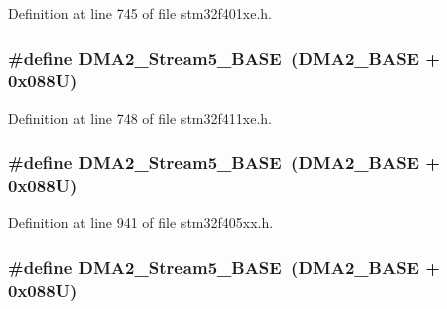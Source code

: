 Definition at line 745 of file stm32f401xe.\+h.

\subsubsection[{\texorpdfstring{D\+M\+A2\+\_\+\+Stream5\+\_\+\+B\+A\+SE}{DMA2_Stream5_BASE}}]{\setlength{\rightskip}{0pt plus 5cm}\#define D\+M\+A2\+\_\+\+Stream5\+\_\+\+B\+A\+SE~({\bf D\+M\+A2\+\_\+\+B\+A\+SE} + 0x088\+U)}\hypertarget{group___peripheral__registers__structures_gaed1460fdc407b6decfbffccb0260d0af}{}\label{group___peripheral__registers__structures_gaed1460fdc407b6decfbffccb0260d0af}


Definition at line 748 of file stm32f411xe.\+h.

\subsubsection[{\texorpdfstring{D\+M\+A2\+\_\+\+Stream5\+\_\+\+B\+A\+SE}{DMA2_Stream5_BASE}}]{\setlength{\rightskip}{0pt plus 5cm}\#define D\+M\+A2\+\_\+\+Stream5\+\_\+\+B\+A\+SE~({\bf D\+M\+A2\+\_\+\+B\+A\+SE} + 0x088\+U)}\hypertarget{group___peripheral__registers__structures_gaed1460fdc407b6decfbffccb0260d0af}{}\label{group___peripheral__registers__structures_gaed1460fdc407b6decfbffccb0260d0af}


Definition at line 941 of file stm32f405xx.\+h.

\subsubsection[{\texorpdfstring{D\+M\+A2\+\_\+\+Stream5\+\_\+\+B\+A\+SE}{DMA2_Stream5_BASE}}]{\setlength{\rightskip}{0pt plus 5cm}\#define D\+M\+A2\+\_\+\+Stream5\+\_\+\+B\+A\+SE~({\bf D\+M\+A2\+\_\+\+B\+A\+SE} + 0x088\+U)}\hypertarget{group___peripheral__registers__structures_gaed1460fdc407b6decfbffccb0260d0af}{}\label{group___peripheral__registers__structures_gaed1460fdc407b6decfbffccb0260d0af}


